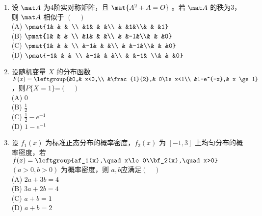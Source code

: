 \begin{enumerate}
(C) 秩 $r(\mat A)=n$ ，秩  $r( \mat B)=m$ \\
(D) 秩 $r(\mat A)=n$ ，秩  $r(\mat B)=n$ \\
\item 设 $\mat A$ 为4阶实对称矩阵，且 $\mat {A^2+A=O}$  。若 $\mat A$ 的秩为3，则 $\mat A$  相似于 $(\quad )$\\
(A) $\pmat{1& & &  \\ &1& & &\\ & &1&\\& & &1}$\\
(B) $\pmat{1& & &  \\ &1& & &\\ & &-1&\\& & &0}$\\
(C) $\pmat{1& & &  \\ &-1& & &\\ & &-1&\\& & &0}$\\
(D) $\pmat{-1& & & \\ &-1& & &\\ & &-1& \\& & &0}$
\item  设随机变量 $X$ 的分布函数 $F(x)=\leftgroup{&0,& x<0,\\ &\frac{1}{2},& 0\le x<1\\ &1-e^{-x},& x \ge 1}$   ，则$P\{X=1\}$=$(\quad )$\\
(A)  $0$\\
(B) $\frac{1}{2}$\\
(C)  $\frac{1}{2}-e^{-1}$\\
(D) $1-e^{-1}$
\item  设 $f_1(x)$ 为标准正态分布的概率密度，$f_2(x)$   为 $[-1,3]$ 上均匀分布的概率密度，若 $f(x)=\leftgroup{af_1(x),\quad x\le0\\bf_2(x),\quad x>0}\quad $ $(a>0,b>0)$ 为概率密度，则 $a,b$应满足$(\quad )$\\
(A) $2a+3b=4$\\
(B)   $3a+2b=4$\\
(C)  $a+b=1$\\
(D)   $a+b=2$
\end{enumerate}
